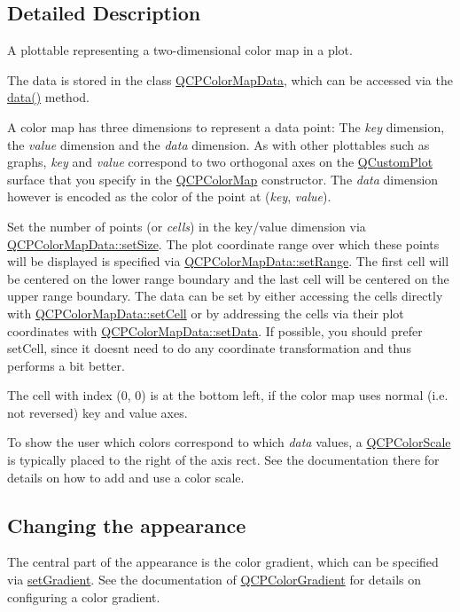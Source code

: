 \subsection{Detailed Description}
A plottable representing a two-\/dimensional color map in a plot. 



The data is stored in the class \mbox{\hyperlink{class_q_c_p_color_map_data}{Q\+C\+P\+Color\+Map\+Data}}, which can be accessed via the \mbox{\hyperlink{class_q_c_p_color_map_a047d7eb3ae657f93f2f39b5e68b79451}{data()}} method.

A color map has three dimensions to represent a data point\+: The {\itshape key} dimension, the {\itshape value} dimension and the {\itshape data} dimension. As with other plottables such as graphs, {\itshape key} and {\itshape value} correspond to two orthogonal axes on the \mbox{\hyperlink{class_q_custom_plot}{Q\+Custom\+Plot}} surface that you specify in the \mbox{\hyperlink{class_q_c_p_color_map}{Q\+C\+P\+Color\+Map}} constructor. The {\itshape data} dimension however is encoded as the color of the point at ({\itshape key}, {\itshape value}).

Set the number of points (or {\itshape cells}) in the key/value dimension via \mbox{\hyperlink{class_q_c_p_color_map_data_a0d9ff35c299d0478b682bfbcdd9c097e}{Q\+C\+P\+Color\+Map\+Data\+::set\+Size}}. The plot coordinate range over which these points will be displayed is specified via \mbox{\hyperlink{class_q_c_p_color_map_data_aad9c1c7c703c1339489fc730517c83d4}{Q\+C\+P\+Color\+Map\+Data\+::set\+Range}}. The first cell will be centered on the lower range boundary and the last cell will be centered on the upper range boundary. The data can be set by either accessing the cells directly with \mbox{\hyperlink{class_q_c_p_color_map_data_a8e75eaf8746596319032a93f3d2d0683}{Q\+C\+P\+Color\+Map\+Data\+::set\+Cell}} or by addressing the cells via their plot coordinates with \mbox{\hyperlink{class_q_c_p_color_map_data_afd2083ccfd6987ec94aa7ef8e91ca39a}{Q\+C\+P\+Color\+Map\+Data\+::set\+Data}}. If possible, you should prefer set\+Cell, since it doesn\textquotesingle{}t need to do any coordinate transformation and thus performs a bit better.

The cell with index (0, 0) is at the bottom left, if the color map uses normal (i.\+e. not reversed) key and value axes.

To show the user which colors correspond to which {\itshape data} values, a \mbox{\hyperlink{class_q_c_p_color_scale}{Q\+C\+P\+Color\+Scale}} is typically placed to the right of the axis rect. See the documentation there for details on how to add and use a color scale.\hypertarget{class_q_c_p_color_map_qcpcolormap-appearance}{}\subsection{Changing the appearance}\label{class_q_c_p_color_map_qcpcolormap-appearance}
The central part of the appearance is the color gradient, which can be specified via \mbox{\hyperlink{class_q_c_p_color_map_a7313c78360471cead3576341a2c50377}{set\+Gradient}}. See the documentation of \mbox{\hyperlink{class_q_c_p_color_gradient}{Q\+C\+P\+Color\+Gradient}} for details on configuring a color gradient.

